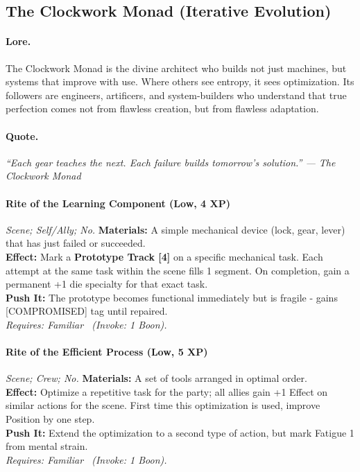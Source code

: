 
\subsection{The Clockwork Monad (Iterative Evolution)}

\paragraph{Lore.}
The Clockwork Monad is the divine architect who builds not just machines, but systems that improve with use. Where others see entropy, it sees optimization. Its followers are engineers, artificers, and system-builders who understand that true perfection comes not from flawless creation, but from flawless adaptation.

\paragraph{Quote.}
\emph{``Each gear teaches the next. Each failure builds tomorrow's solution.'' — The Clockwork Monad}

\paragraph{Rite of the Learning Component (Low, 4 XP)} \emph{Scene; Self/Ally; No.}
\textbf{Materials:} A simple mechanical device (lock, gear, lever) that has just failed or succeeded. \\
\textbf{Effect:} Mark a \textbf{Prototype Track [4]} on a specific mechanical task. Each attempt at the same task within the scene fills 1 segment. On completion, gain a permanent +1 die specialty for that exact task. \\
\textbf{Push It:} The prototype becomes functional immediately but is fragile - gains [COMPROMISED] tag until repaired. \\
\emph{Requires: Familiar \ (\textit{Invoke:} 1 Boon).}

\paragraph{Rite of the Efficient Process (Low, 5 XP)} \emph{Scene; Crew; No.}
\textbf{Materials:} A set of tools arranged in optimal order. \\
\textbf{Effect:} Optimize a repetitive task for the party; all allies gain +1 Effect on similar actions for the scene. First time this optimization is used, improve Position by one step. \\
\textbf{Push It:} Extend the optimization to a second type of action, but mark Fatigue 1 from mental strain. \\
\emph{Requires: Familiar \ (\textit{Invoke:} 1 Boon).}

